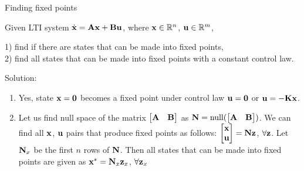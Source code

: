 \documentclass{beamer}
\begin{document}
\begin{frame}{Finding fixed points}
\begin{flushleft}

Given LTI system $\dot{\mathbf{x}} = \mathbf{A} \mathbf{x} + \mathbf{B} \mathbf{u}$, where $\mathbf{x} \in \mathbb{R}^n$, $\mathbf{u} \in \mathbb{R}^m$, 

1) find if there are states that can be made into fixed points, \\
2) find all states that can be made into fixed points with a constant control law.

\bigskip

Solution: 

\begin{enumerate}
    \item Yes, state $\mathbf{x} = \mathbf{0}$ becomes a fixed point under control law $\mathbf{u} = \mathbf{0}$ or $\mathbf{u} = -\mathbf{K}\mathbf{x}$.
    \item Let us find null space of the matrix $\begin{bmatrix} \mathbf{A} & \mathbf{B} \end{bmatrix}$ as $\mathbf{N} = \text{null} (\begin{bmatrix} \mathbf{A} & \mathbf{B} \end{bmatrix})$. We can find all $\mathbf{x}$, $\mathbf{u}$ pairs that produce fixed points as follows: $\begin{bmatrix} \mathbf{x} \\ \mathbf{u} \end{bmatrix} = \mathbf{N} \mathbf{z}$, $\forall \mathbf{z}$. Let $\mathbf{N}_x$ be the first $n$ rows of $\mathbf{N}$. Then all states that can be made into fixed points are given as $\mathbf{x}^* = \mathbf{N}_x \mathbf{z}_x$, $\forall \mathbf{z}_x$
\end{enumerate}

\end{flushleft}
\end{frame}
\end{document}
